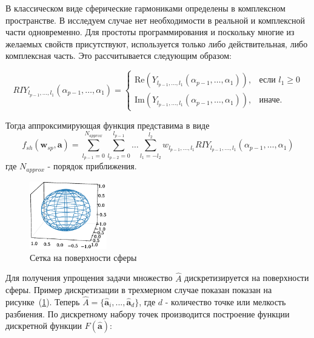\documentclass[12pt,twoside]{article}
\begin{document}
В классическом виде сферические гармониками определены в комплексном пространстве. В исследуем случае нет необходимости в реальной и комплексной части одновременно. Для простоты программирования и поскольку многие из желаемых свойств присутствуют, используется только либо действительная, либо комплексная часть. Это рассчитывается следующим образом:

\begin{equation}
	RIY_{l_{p-1},...,l_1}(\alpha_{p-1},\dots,\alpha_1) = \begin{cases}
	\text{Re}(Y_{l_{p-1},...,l_1}(\alpha_{p-1},\dots,\alpha_1)), & \mbox{если } l_1 \geq 0\\
    \text{Im}(Y_{l_{p-1},...,l_1}(\alpha_{p-1},\dots,\alpha_1)), & \mbox{иначе}.
    \end{cases}
\label{eq:RTY}
\end{equation}

\vspace{\baselineskip}

Тогда аппроксимирующая функция представима в виде
\begin{equation}
	f_{sh}(\mathbf{w}_{sp},\mathbf{a}) = \sum_{l_{p-1} = 0}^{N_{approx}}
	                                \sum_{l_{p-2} = 0}^{l_{p-1}}
	                                \dots 
	                                \sum_{l_1 = -l_2}^{l_2}  
	                                w_{l_{p-1},...,l_1} RIY_{l_{p-1},...,l_1}(\alpha_{p-1},\dots,\alpha_1)
\label{eq:f_ph_3d}
\end{equation}
где $N_{approx}$ - порядок приближения. 
\vspace{\baselineskip}

\begin{figure}[h]
\centering
\includegraphics[width=0.3\textwidth]{figs/sp_mesh.eps}
\caption{Сетка на поверхности сферы}
\label{fg:sp_mesh}
\end{figure}

Для получения упрощения задачи множество $\hat{A}$ дискретизируется на поверхности сферы. Пример дискретизации в трехмерном случае показан показан на рисунке~(\ref{fg:sp_mesh}).
Теперь $\hat{A} = \{\hat{\mathbf{a}}_i,...,\hat{\mathbf{a}}_d\}$, где $d$ - количество точке или мелкость разбиения.
По дискретному набору точек производится построение функции дискретной функции $F(\hat{\mathbf{a}})$:
\end{document}

